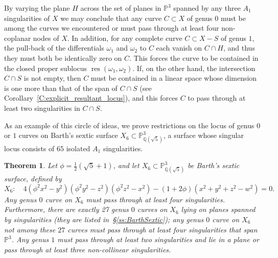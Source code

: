 \documentclass[12pt, reqno]{amsart}
\newtheorem{theorem}[lemma]{Theorem}
\theoremstyle{definition}
\newcommand{\PP}{{\mathbb P}}
\newcommand{\Q}{{\mathbb Q}}
\DeclareMathOperator{\res}{res}
\numberwithin{equation}{section}
\numberwithin{table}{section}
\begin{document}
By varying the plane $H$ across the set of planes in $\PP^3$ spanned by any three $A_1$ singularities of $X$ we may conclude that any curve $C\subset X$ of genus $0$ must be among the curves we encountered or must pass through at least four non-coplanar nodes of $X$.  In addition, for any complete curve $C \subset X - S$ of genus $1$, the pull-back of the differentials $\omega_1$ and $\omega_2$ to $C$ each vanish on $C\cap H$, and thus they must both be identically zero on $C$. This forces the curve to be contained in the closed proper sublocus $\res(\omega_1,\omega_2)$.  If, on the other hand, the intersection $C\cap S$ is not empty, then $C$ must be contained in a linear space whose dimension is one more than that of the span of $C\cap S$ (see Corollary~\ref{C:explicit_resultant_locus}), and this forces $C$ to pass through at least two singularities in $C\cap S$.

As an example of this circle of ideas, we prove restrictions on the locus of genus $0$ or $1$ curves on Barth's sextic surface $X_6 \subset \PP^3_{\Q(\sqrt{5})}$, a surface whose singular locus consists of $65$ isolated $A_1$ singularities.

\begin{theorem}
\label{thm:BarthIntro}
Let $\phi=\frac{1}{2}(\sqrt{5}+1)$, and let $X_6 \subset \PP^3_{\Q(\sqrt{5})}$ be Barth's sextic surface, defined by
\[
X_6 : \quad 4(\phi^2x^2-y^2)(\phi^2y^2-z^2)(\phi^2z^2-x^2)-(1+2\phi)(x^2+y^2+z^2-w^2)=0.
\]
Any genus $0$ curve on $X_6$ must pass through at least four singularities.  Furthermore, there are exactly 27 genus $0$ curves on $X_6$ lying on planes spanned by singularities (they are listed in~\S\ref{ss:BarthSextic}); any genus $0$ curve on $X_6$ not among these $27$ curves must pass through at least four singularities that span $\PP^3$. Any genus $1$ must pass through at least two singularities and lie in a plane or pass through at least three non-collinear singularities.
\end{theorem}
\end{document}
